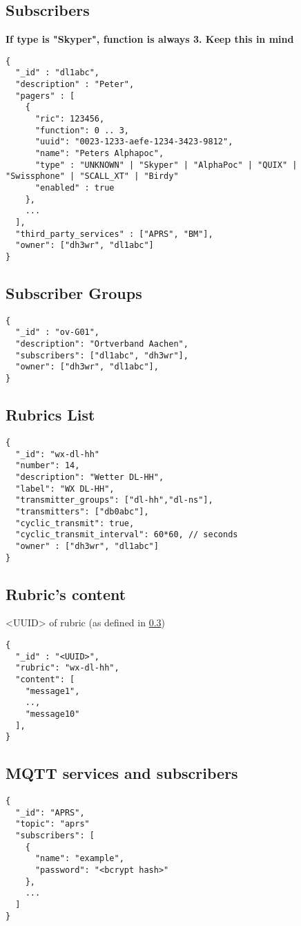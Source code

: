 \subsection{Subscribers}
\label{protocoldef:couchdb:subscribers}
\textbf{If type is "Skyper", function is always 3. Keep this in mind }
\begin{lstlisting}
{
  "_id" : "dl1abc",
  "description" : "Peter",
  "pagers" : [
    {
      "ric": 123456,
      "function": 0 .. 3,
      "uuid": "0023-1233-aefe-1234-3423-9812",
      "name": "Peters Alphapoc",
      "type" : "UNKNOWN" | "Skyper" | "AlphaPoc" | "QUIX" | "Swissphone" | "SCALL_XT" | "Birdy"
      "enabled" : true
    },
    ...
  ],
  "third_party_services" : ["APRS", "BM"],
  "owner": ["dh3wr", "dl1abc"]
}
\end{lstlisting}

\subsection{Subscriber Groups}

\begin{lstlisting}
{
  "_id" : "ov-G01",
  "description": "Ortverband Aachen",
  "subscribers": ["dl1abc", "dh3wr"],
  "owner": ["dh3wr", "dl1abc"],
}
\end{lstlisting}

\subsection{Rubrics List}
\label{rubric_list}

\begin{lstlisting}
{
  "_id": "wx-dl-hh"
  "number": 14,
  "description": "Wetter DL-HH",
  "label": "WX DL-HH",
  "transmitter_groups": ["dl-hh","dl-ns"],
  "transmitters": ["db0abc"],
  "cyclic_transmit": true,
  "cyclic_transmit_interval": 60*60, // seconds
  "owner" : ["dh3wr", "dl1abc"]
}
\end{lstlisting}

\subsection{Rubric's content}
<UUID> of rubric (as defined in \ref{rubric_list})

\begin{lstlisting}
{
  "_id" : "<UUID>",
  "rubric": "wx-dl-hh",
  "content": [
    "message1",
    ..,
    "message10"
  ],
}
\end{lstlisting}

\subsection{MQTT services and subscribers}
\label{protocoldef:couchdb:mqttservicesandsubscribers}
\begin{lstlisting}
{
  "_id": "APRS",
  "topic": "aprs"
  "subscribers": [
    {
      "name": "example",
      "password": "<bcrypt hash>"
    },
    ...
  ]
}
\end{lstlisting}
